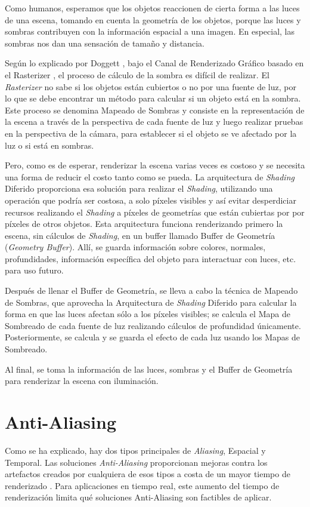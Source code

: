 \documentclass[pregrado]{tesis-usb} %
\begin{document}
Como humanos, esperamos que los objetos reaccionen de cierta forma a las luces de una escena, tomando en cuenta la geometría de los objetos, porque las luces y sombras contribuyen con la información espacial a una imagen. En especial, las sombras nos dan una sensación de tamaño y distancia.

Según lo explicado por Doggett \cite{Doggett2017EDAN35}, bajo el Canal de Renderizado Gráfico basado en el Rasterizer , el proceso de cálculo de la sombra es difícil de realizar. El \textit{Rasterizer} no sabe si los objetos están cubiertos o no por una fuente de luz, por lo que se debe encontrar un método para calcular si un objeto está en la sombra. Este proceso se denomina Mapeado de Sombras y consiste en la representación de la escena a través de la perspectiva de cada fuente de luz y luego realizar pruebas en la perspectiva de la cámara, para establecer si el objeto se ve afectado por la luz o si está en sombras.

Pero, como es de esperar, renderizar la escena varias veces es costoso y se necesita una forma de reducir el costo tanto como se pueda. La arquitectura de \textit{Shading} Diferido proporciona esa solución para realizar el \textit{Shading}, utilizando una operación que podría ser costosa, a solo píxeles visibles y así evitar desperdiciar recursos realizando el \textit{Shading} a píxeles de geometrías que están cubiertas por por píxeles de otros objetos. Esta arquitectura funciona renderizando primero la escena, sin cálculos de \textit{Shading}, en un buffer llamado Buffer de Geometría (\textit{Geometry Buffer}). Allí, se guarda información sobre colores, normales, profundidades, información específica del objeto para interactuar con luces, etc. para uso futuro. 

Después de llenar el Buffer de Geometría, se lleva a cabo la técnica de Mapeado de Sombras, que aprovecha la Arquitectura de \textit{Shading} Diferido para calcular la forma en que las luces afectan sólo a los píxeles visibles; se calcula el Mapa de Sombreado de cada fuente de luz realizando cálculos de profundidad únicamente. Posteriormente, se calcula y se guarda el efecto de cada luz usando los Mapas de Sombreado.

Al final, se toma la información de las luces, sombras y el Buffer de Geometría para renderizar la escena con iluminación.


\section{Anti-Aliasing}
Como se ha explicado, hay dos tipos principales de \textit{Aliasing}, Espacial y Temporal. Las soluciones \textit{Anti-Aliasing} proporcionan mejoras contra los artefactos creados por cualquiera de esos tipos a costa de un mayor tiempo de renderizado \cite{Doggett2017EDAN35}. Para aplicaciones en tiempo real, este aumento del tiempo de renderización limita qué soluciones Anti-Aliasing son factibles de aplicar.
\end{document}
